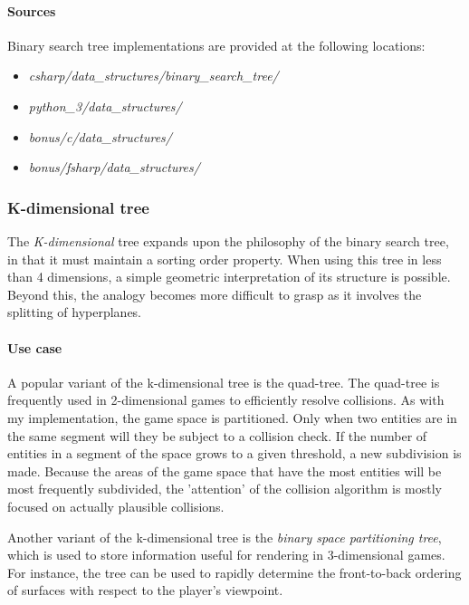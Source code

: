\documentclass{article}
\begin{document}
\begin{samepage}
  \paragraph{Sources}
  Binary search tree implementations are provided at the following locations:
  \begin{itemize}
  \item{{\em csharp/data\_structures/binary\_search\_tree/}}
  \item{{\em python\_3/data\_structures/}}
  \item{{\em bonus/c/data\_structures/}}
  \item{{\em bonus/fsharp/data\_structures/}}
  \end{itemize}
\end{samepage}


\subsubsection{K-dimensional tree}
The {\em K-dimensional} tree expands upon the philosophy of the binary search tree, in that it
must maintain a sorting order property. When using this tree in less than 4 dimensions,
a simple geometric interpretation of its structure is possible. Beyond this, the analogy becomes
more difficult to grasp as it involves the splitting of hyperplanes.

\paragraph{Use case}
A popular variant of the k-dimensional tree is the quad-tree. The quad-tree is frequently used in 2-dimensional games to
efficiently resolve collisions. As with my implementation, the game space is partitioned. Only when two entities are in the same
segment will they be subject to a collision check. If the number of entities in a segment of the space grows to a given
threshold, a new subdivision is made. Because the areas of the game space that have the most entities will be most frequently
subdivided, the 'attention' of the collision algorithm is mostly focused on actually plausible collisions.

Another variant of the k-dimensional tree is the {\em binary space partitioning tree}, which is used to store information useful
for rendering in 3-dimensional games. For instance, the tree can be used to rapidly determine the front-to-back ordering of
surfaces with respect to the player's viewpoint.
\end{document}
